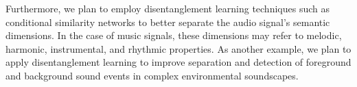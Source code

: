 \documentclass[11pt,a4paper]{article}
\newcommand{\iec}{i.e.,\ }
\newcommand{\egc}{e.g.,\ }
\newcommand{\meinard}[1]{{\color{red} #1}}
\theoremstyle{plain} \newtheorem{define}{Definition}[section]
\begin{document}
{\begin{enumerate}
%
Furthermore, we plan to employ disentanglement learning techniques such as conditional similarity networks \cite{Lee:2020:Disentangle:ISMIR} to better separate the audio signal's semantic dimensions. In the case of music signals, these dimensions may refer to melodic, harmonic, instrumental, and rhythmic properties.
% 
%
As another example, we plan to apply disentanglement learning to improve separation and detection of foreground and background sound events in complex environmental soundscapes.
%


\end{enumerate}}
\end{document}
